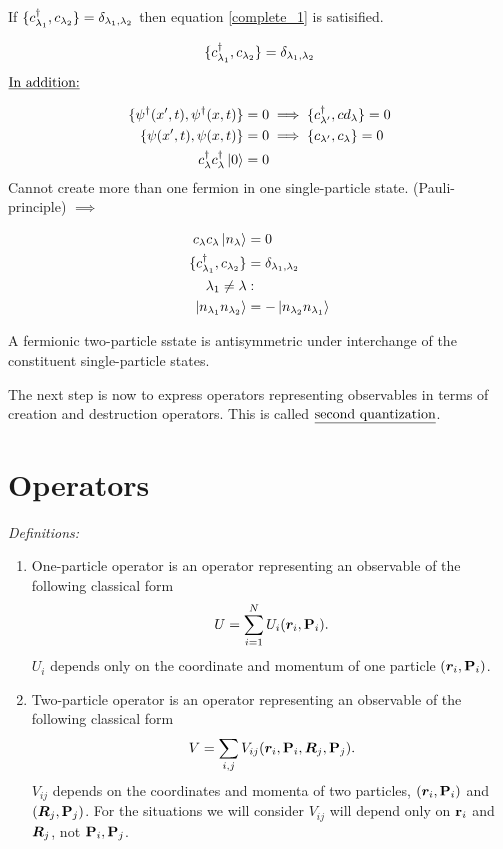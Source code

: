 If $\{c^{\dagger}_{\lambda_1}, c_{\lambda_2}\}= \delta_{\lambda_1, \lambda_2}$ then equation \eqref{complete_1} is satisified.

\begin{equation}
	\{c^{\dagger}_{\lambda_1}, c_{\lambda_2}\}= \delta_{\lambda_1, \lambda_2}
\end{equation}

\noindent $\emph{\text{In addition:}}$

\begin{align}
	\{ \psi^\dagger(x',t), \psi^\dagger(x,t) \} &= 0 \implies \{c^{\dagger}_{\lambda'}, cd_\lambda\} =0\\
	\{ \psi(x',t), \psi(x,t) \} &= 0 \implies \{c_{\lambda'}, c_\lambda\} =0\\
	c^{\dagger}_\lambda c^{\dagger}_\lambda \ket{0}&=0
\end{align}
Cannot create more than one fermion in one single-particle state. (Pauli-principle) $\implies$

\begin{align*}
	c_\lambda c_\lambda \ket{n_\lambda}&=0\\
	\{c^{\dagger}_{\lambda_1},c_{\lambda_2}\}&= \delta_{\lambda_1, \lambda_2}\\
	\lambda_1 \neq \lambda &:\\
	\ket{n_{\lambda_1} n_{\lambda_2}} &= - \ket{n_{\lambda_2} n_{\lambda_1}}
\end{align*}

\noindent A fermionic two-particle sstate is antisymmetric under interchange of the constituent single-particle states.

\begin{tcolorbox}
	The next step is now to express operators representing observables in terms of creation and destruction operators. This is called $\emph{\text{second quantization}}$.
\end{tcolorbox}

\section{Operators}

\noindent \emph{Definitions:}

\begin{enumerate}
	\item
		One-particle operator is an operator representing an observable of the following classical form
		\begin{equation}
			U= \sum_{i=1}^{N} U_i(\bm{r}_i, \vb{P}_i).
		\end{equation}
		$U_i$ depends only on the coordinate and momentum of one particle $(\bm{r}_i, \vb{P}_i)$.
	\item
		Two-particle operator is an operator representing an observable of the following classical form
		\begin{equation}
			V= \sum_{i,j } V_{ij} (\bm{r}_i, \vb{P}_i,\bm{R}_j, \vb{P}_j).
		\end{equation}
		$V_{ij}$ depends on the coordinates and momenta of two particles, $(\bm{r}_i, \vb{P}_i)$ and $(\bm{R}_j, \vb{P}_j)$. For the situations we will consider $V_{ij}$ will depend only on $\vb{r}_i$ and $\bm{R}_j$, not $\vb{P}_i, \vb{P}_j$.
\end{enumerate}

